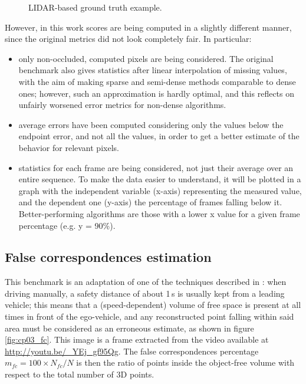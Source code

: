 \begin{figure}[h!]
        \caption{\ac{LIDAR}-based ground truth example.}\label{fig:cp03_lidarGT}
\end{figure}

However, in this work scores are being computed in a slightly different manner, since the original metrics did not look completely fair. In particular:
\begin{itemize}
\item only non-occluded, computed pixels are being considered. The original benchmark also gives statistics after linear interpolation of missing values, with the aim of making sparse and semi-dense methods comparable to dense ones; however, such an approximation is hardly optimal, and this reflects on unfairly worsened error metrics for non-dense algorithms.
\item average errors have been computed considering only the values below the endpoint error, and not all the values, in order to get a better estimate of the behavior for relevant pixels.
\item statistics for each frame are being considered, not just their average over an entire sequence. To make the data easier to understand, it will be plotted in a graph with the independent variable (x-axis) representing the measured value, and the dependent one (y-axis) the percentage of frames falling below it. Better-performing algorithms are those with a lower x value for a given frame percentage (e.g. y = 90\%).
\end{itemize}

\subsection{False correspondences estimation}\label{ch:chapter03_02}

This benchmark is an adaptation of one of the techniques described in \cite{Steingrube2009}: when driving manually, a safety distance of about 1\,s is usually kept from a leading vehicle; this means that a (speed-dependent) volume of free space is present at all times in front of the ego-vehicle, and any reconstructed point falling within said area must be considered as an erroneous estimate, as shown in figure \ref{fig:cp03_fc}. This image is a frame extracted from the video available at \url{http://youtu.be/_YEj_gf95Qg}. The false correspondences percentage $m_{fc} = 100 \times N_{fc} / N$ is then the ratio of points inside the object-free volume with respect to the total number of 3D points. 


